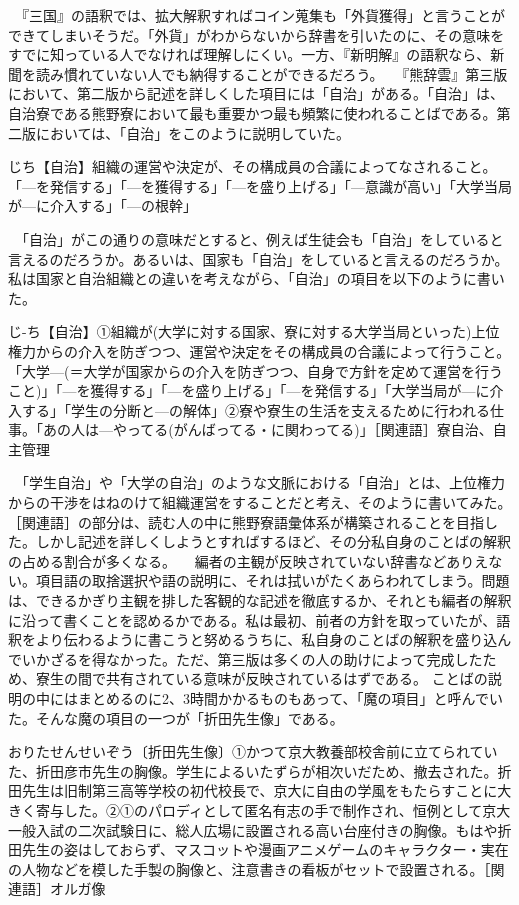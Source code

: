 　『三国』の語釈では、拡大解釈すればコイン蒐集も「外貨獲得」と言うことができてしまいそうだ。「外貨」がわからないから辞書を引いたのに、その意味をすでに知っている人でなければ理解しにくい。一方、『新明解』の語釈なら、新聞を読み慣れていない人でも納得することができるだろう。
　『熊辞雲』第三版において、第二版から記述を詳しくした項目には「自治」がある。「自治」は、自治寮である熊野寮において最も重要かつ最も頻繁に使われることばである。第二版においては、「自治」をこのように説明していた。
 
じち【自治】組織の運営や決定が、その構成員の合議によってなされること。「—を発信する」「—を獲得する」「—を盛り上げる」「—意識が高い」「大学当局が—に介入する」「—の根幹」

　「自治」がこの通りの意味だとすると、例えば生徒会も「自治」をしていると言えるのだろうか。あるいは、国家も「自治」をしていると言えるのだろうか。私は国家と自治組織との違いを考えながら、「自治」の項目を以下のように書いた。
 
じ-ち【自治】①組織が(大学に対する国家、寮に対する大学当局といった)上位権力からの介入を防ぎつつ、運営や決定をその構成員の合議によって行うこと。「大学—(＝大学が国家からの介入を防ぎつつ、自身で方針を定めて運営を行うこと)」「—を獲得する」「—を盛り上げる」「—を発信する」「大学当局が—に介入する」「学生の分断と—の解体」②寮や寮生の生活を支えるために行われる仕事。「あの人は—やってる(がんばってる・に関わってる)」［関連語］寮自治、自主管理
 
　「学生自治」や「大学の自治」のような文脈における「自治」とは、上位権力からの干渉をはねのけて組織運営をすることだと考え、そのように書いてみた。［関連語］の部分は、読む人の中に熊野寮語彙体系が構築されることを目指した。しかし記述を詳しくしようとすればするほど、その分私自身のことばの解釈の占める割合が多くなる。
　編者の主観が反映されていない辞書などありえない。項目語の取捨選択や語の説明に、それは拭いがたくあらわれてしまう。問題は、できるかぎり主観を排した客観的な記述を徹底するか、それとも編者の解釈に沿って書くことを認めるかである。私は最初、前者の方針を取っていたが、語釈をより伝わるように書こうと努めるうちに、私自身のことばの解釈を盛り込んでいかざるを得なかった。ただ、第三版は多くの人の助けによって完成したため、寮生の間で共有されている意味が反映されているはずである。
ことばの説明の中にはまとめるのに2、3時間かかるものもあって、「魔の項目」と呼んでいた。そんな魔の項目の一つが「折田先生像」である。
 
おりたせんせいぞう〔折田先生像〕①かつて京大教養部校舎前に立てられていた、折田彦市先生の胸像。学生によるいたずらが相次いだため、撤去された。折田先生は旧制第三高等学校の初代校長で、京大に自由の学風をもたらすことに大きく寄与した。②①のパロディとして匿名有志の手で制作され、恒例として京大一般入試の二次試験日に、総人広場に設置される高い台座付きの胸像。もはや折田先生の姿はしておらず、マスコットや漫画アニメゲームのキャラクター・実在の人物などを模した手製の胸像と、注意書きの看板がセットで設置される。［関連語］オルガ像
 
